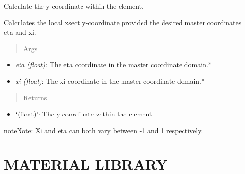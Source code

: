 \documentclass[letterpaper,10pt,english]{sphinxmanual}
\begin{document}
\begin{fulllineitems}
\begin{fulllineitems}
\end{fulllineitems}


\begin{fulllineitems}
\label{structures:AeroComBAT.Structures.CQUAD4.y}
Calculate the y-coordinate within the element.

Calculates the local xsect y-coordinate provided the desired master
coordinates eta and xi.
\begin{quote}\begin{description}
\item[{Args}] \leavevmode
\end{description}\end{quote}
\begin{itemize}
\item {} 
\emph{eta (float)}: The eta coordinate in the master coordinate domain.*

\item {} 
\emph{xi (float)}: The xi coordinate in the master coordinate domain.*

\end{itemize}
\begin{quote}\begin{description}
\item[{Returns}] \leavevmode
\end{description}\end{quote}
\begin{itemize}
\item {} 
{\color{red}\bfseries{}{}`}(float)': The y-coordinate within the element.

\end{itemize}

\begin{notice}{note}{Note:}
Xi and eta can both vary between -1 and 1 respectively.
\end{notice}

\end{fulllineitems}


\end{fulllineitems}



\section{MATERIAL LIBRARY}
\label{structures:material-library}
\end{document}
